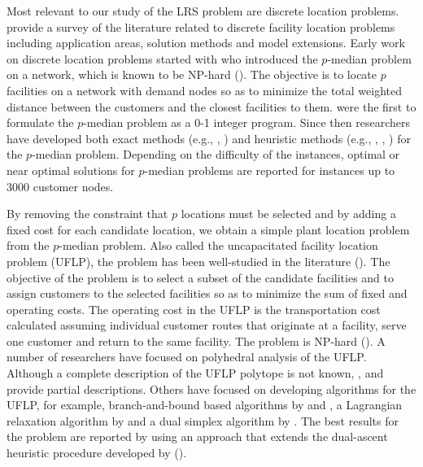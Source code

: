 Most relevant to our study of the LRS problem are discrete location problems. 
\citet{Labbe} provide a survey of the literature related to discrete facility 
location problems including application areas, solution methods and model 
extensions. Early work on discrete location problems started with 
\citet{Hakimi64, Hakimi65} who introduced the $p$-median problem on a network, 
which is known to be NP-hard (\citet{Kariv}). The objective is to locate $p$ 
facilities on a network with demand nodes so as to minimize the total weighted 
distance between the customers and the closest facilities to them.
\citet{ReVelle2} were the first to formulate the $p$-median problem as a 0-1 integer 
program. Since then researchers have developed both exact methods 
(e.g., \citet{Galvao}, \citet{Bilde}) and heuristic methods 
(e.g., \citet{Maranzana}, \citet{Teitz}, \citet{Rosing}) for the $p$-median problem. 
Depending on the difficulty of the instances, optimal or near optimal solutions 
for $p$-median problems are reported for instances up to 3000 customer nodes. 

By removing the constraint that $p$ locations must be selected and by adding a 
fixed cost for each candidate location, we obtain a simple plant location 
problem from the $p$-median problem. Also called the uncapacitated facility 
location problem (UFLP), the problem has been well-studied in the literature 
(\citet{Cornuejols2}). The objective of the problem is to select a subset 
of the candidate facilities and to assign customers to the selected facilities 
so as to minimize the sum of fixed and operating costs. The operating cost in 
the UFLP is the transportation cost calculated assuming individual customer 
routes that originate at a facility, serve one customer and return to the 
same facility. The problem is NP-hard (\citet{Cornuejols2}). A number of 
researchers have focused on polyhedral analysis of the UFLP. Although a 
complete description of the UFLP polytope is not known, \citet{Guignard}, 
\citet{Cornuejols} and \citet {Cho83a,Cho83b} provide partial descriptions. 
Others have focused on developing algorithms for the UFLP, for example, 
branch-and-bound based algorithms by \citet{Erlenkotter} and \citet{Korkel}, 
a Lagrangian relaxation algorithm by \citet{Cornuejols77} and a dual 
simplex algorithm by \citet{Simao}. The best results for the problem are
reported by \citet{Korkel} using an approach that extends the dual-ascent 
heuristic procedure developed by \citet{Erlenkotter} (\citet{ReVelle}). 


